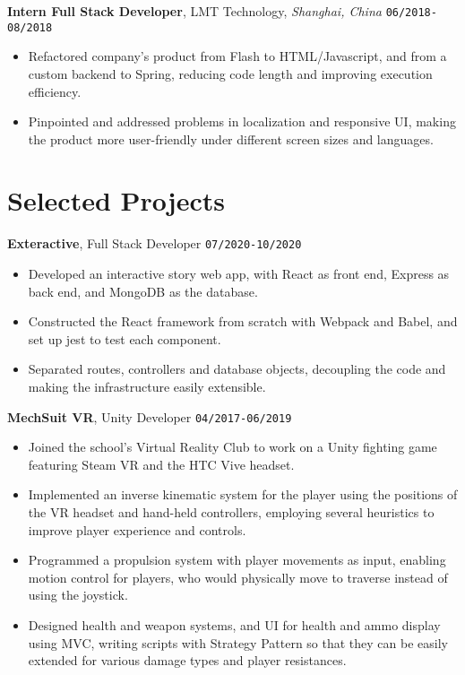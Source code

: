 \documentclass[10pt, letterpaper]{article}
\begin{document}
	\textbf{\large Intern Full Stack Developer}, LMT Technology, \textit{Shanghai, China} \hfill \texttt{06/2018-08/2018}
	\begin{itemize}
		\item Refactored company's product from Flash to HTML/Javascript, and from a custom backend to Spring, reducing code length and improving execution efficiency.

		\item Pinpointed and addressed problems in localization and responsive UI, making the product more user-friendly under different screen sizes and languages.

	\end{itemize}
	\section{Selected Projects}
	\smallskip
	\textbf{\large Exteractive}, Full Stack Developer \hfill \texttt{07/2020-10/2020}
	\begin{itemize}
		\item Developed an interactive story web app, with React as front end, Express as back end, and MongoDB as the database.

		\item Constructed the React framework from scratch with Webpack and Babel, and set up jest to test each component.

		\item Separated routes, controllers and database objects, decoupling the code and making the infrastructure easily extensible.

	\end{itemize}
	\textbf{\large MechSuit VR}, Unity Developer \hfill \texttt{04/2017-06/2019}
	\begin{itemize}
		\item Joined the school's Virtual Reality Club to work on a Unity fighting game featuring Steam VR and the HTC Vive headset.

		\item Implemented an inverse kinematic system for the player using the positions of the VR headset and hand-held controllers, employing several heuristics to improve player experience and controls.

		\item Programmed a propulsion system with player movements as input, enabling motion control for players, who would physically move to traverse instead of using the joystick.

		\item Designed health and weapon systems, and UI for health and ammo display using MVC, writing scripts with Strategy Pattern so that they can be easily extended for various damage types and player resistances.

	\end{itemize}
\end{document}
